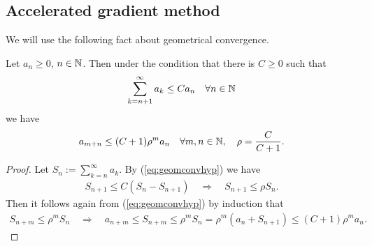\documentclass[english,12pt,a4paper]{article}
\begin{document}
%
\subsection{Accelerated gradient method}\label{subsec:}
%
We will use the following fact about geometrical convergence.
\begin{lemma}\label{lemma:geomconv}
Let $a_n\ge 0$, $n\in\mathbb N$. Then under the condition that there is $C\ge0$ such that
%
\begin{equation}\label{eq:geomconvhyp}
\sum_{k=n+1}^{\infty} a_k \le C a_n\quad \forall n\in\mathbb N
\end{equation}
%
we have
%
\begin{equation}\label{eq:geomconvres}
a_{m+n} \le (C+1) \rho^m a_n\quad \forall m,n\in\mathbb N, \quad\rho=\frac{C}{C+1}.
\end{equation}
%
\end{lemma}
% 
\begin{proof}
Let $S_n := \sum_{k=n}^{\infty} a_k$. By (\ref{eq:geomconvhyp}) we have
%
\begin{align*}
S_{n+1} \le C\left( S_{n}-S_{n+1}\right)\quad\Rightarrow\quad S_{n+1} \le \rho S_n.
\end{align*}
%
Then it follows again from (\ref{eq:geomconvhyp}) by induction that
%
\begin{align*}
S_{n+m} \le \rho^m S_n \quad\Rightarrow\quad a_{n+m} \le S_{n+m} \le  \rho^m S_n = \rho^m (a_n + S_{n+1}) 
\le (C+1) \rho^m a_n.
\end{align*}
%

\end{proof}
%
\end{document}
